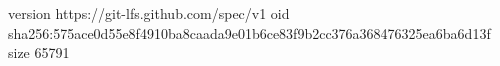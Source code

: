 version https://git-lfs.github.com/spec/v1
oid sha256:575ace0d55e8f4910ba8caada9e01b6ce83f9b2cc376a368476325ea6ba6d13f
size 65791
